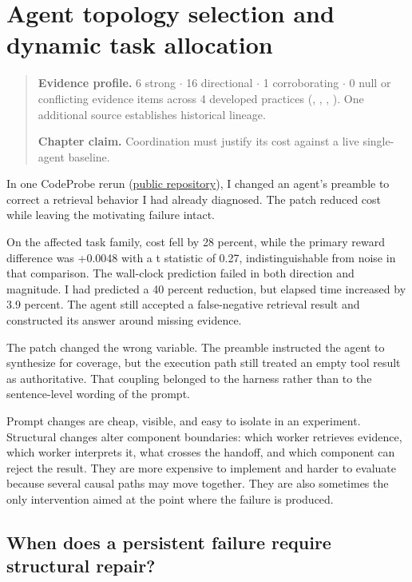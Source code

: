 \chapter{Agent topology selection and dynamic task allocation}
\label{ch18-agent-topology-dynamic-task-allocation}
\begin{quote}
\textbf{Evidence profile.} 6 strong \(\cdot\) 16 directional \(\cdot\) 1 corroborating \(\cdot\) 0 null or conflicting evidence items across 4 developed practices (, , , ). One additional source establishes historical lineage.

\textbf{Chapter claim.} Coordination must justify its cost against a live single-agent baseline.
\end{quote}

In one CodeProbe rerun (\href{https://github.com/sjarmak/codeprobe}{public repository}), I changed an agent's preamble to correct a retrieval behavior I had already diagnosed. The patch reduced cost while leaving the motivating failure intact.

On the affected task family, cost fell by 28 percent, while the primary reward difference was +0.0048 with a t statistic of 0.27, indistinguishable from noise in that comparison. The wall-clock prediction failed in both direction and magnitude. I had predicted a 40 percent reduction, but elapsed time increased by 3.9 percent. The agent still accepted a false-negative retrieval result and constructed its answer around missing evidence.

The patch changed the wrong variable. The preamble instructed the agent to synthesize for coverage, but the execution path still treated an empty tool result as authoritative. That coupling belonged to the harness rather than to the sentence-level wording of the prompt.

Prompt changes are cheap, visible, and easy to isolate in an experiment. Structural changes alter component boundaries: which worker retrieves evidence, which worker interprets it, what crosses the handoff, and which component can reject the result. They are more expensive to implement and harder to evaluate because several causal paths may move together. They are also sometimes the only intervention aimed at the point where the failure is produced.

\hypertarget{when-does-a-persistent-failure-require-structural-repair}{%
\section{When does a persistent failure require structural repair?}\label{when-does-a-persistent-failure-require-structural-repair}}

